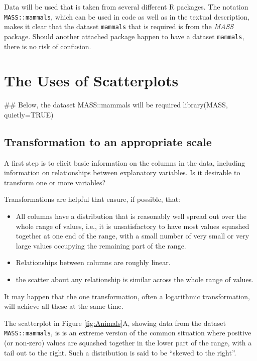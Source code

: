 \documentclass{tufte-book}\usepackage[]{graphicx}\usepackage[]{color}
\newcommand{\txtt}[1]{\texttt{#1}}
\newenvironment{itemizz}%
  {\begin{itemize} %
    \setlength{\itemsep}{2pt}%
    \setlength{\parskip}{2pt}} %
  {\end{itemize}}
\begin{document}
Data will be used that is taken from several different R packages.
The notation \txtt{MASS::mammals}, which can be used in code as well
as in the textual description, makes it clear that the dataset
\txtt{mammals} that is required is from the {\em MASS} package.
Should another attached package happen to have a dataset
\txtt{mammals}, there is no risk of confusion.

\section{The Uses of Scatterplots}

\begin{Schunk}
\begin{Sinput}
## Below, the dataset MASS::mammals will be required
library(MASS, quietly=TRUE)
\end{Sinput}
\end{Schunk}

\subsection{Transformation to an appropriate scale}

A first step is to elicit basic information on the columns in the
data, including information on relationships between explanatory
variables.  Is it desirable to transform one or more variables?

Transformations are helpful that ensure, if possible, that:
\begin{itemizz}
\item All columns have a distribution that is reasonably well spread
  out over the whole range of values, i.e., it is unsatisfactory to
  have most values squashed together at one end of the range, with a
  small number of very small or very large values occupying the
  remaining part of the range.
  \item Relationships between columns are roughly linear.
  \item the scatter about any relationship is similar across the whole
range of values.
\end{itemizz}
It may happen that the one transformation, often a logarithmic
transformation, will achieve all these at the same time.

The scatterplot in Figure \ref{fig:Animals}A, showing data from the
dataset \txtt{MASS::mammals}, is is an extreme version of the
common situation where positive (or non-zero) values are squashed
together in the lower part of the range, with a tail out to the right.
Such a distribution is said to be ``skewed to the right''.
\end{document}
